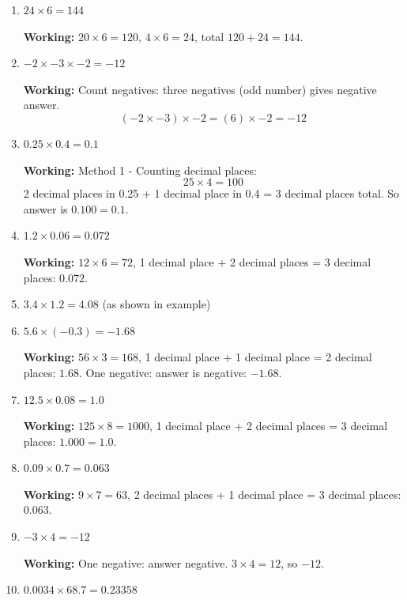 \documentclass[12pt,a4paper]{article}
\begin{document}
\begin{enumerate}
    \item $24 \times 6 = 144$
    
    \textbf{Working:} $20 \times 6 = 120$, $4 \times 6 = 24$, total $120 + 24 = 144$.
    
    \item $-2 \times -3 \times -2 = -12$
    
    \textbf{Working:} Count negatives: three negatives (odd number) gives negative answer.
    \[(-2 \times -3) \times -2 = (6) \times -2 = -12\]
    
    \item $0.25 \times 0.4 = 0.1$
    
    \textbf{Working:} Method 1 - Counting decimal places:
    \[25 \times 4 = 100\]
    2 decimal places in 0.25 + 1 decimal place in 0.4 = 3 decimal places total.
    So answer is $0.100 = 0.1$.
    
    \item $1.2 \times 0.06 = 0.072$
    
    \textbf{Working:} $12 \times 6 = 72$, 1 decimal place + 2 decimal places = 3 decimal places: $0.072$.
    
    \item $3.4 \times 1.2 = 4.08$ (as shown in example)
    
    \item $5.6 \times (-0.3) = -1.68$
    
    \textbf{Working:} $56 \times 3 = 168$, 1 decimal place + 1 decimal place = 2 decimal places: $1.68$.
    One negative: answer is negative: $-1.68$.
    
    \item $12.5 \times 0.08 = 1.0$
    
    \textbf{Working:} $125 \times 8 = 1000$, 1 decimal place + 2 decimal places = 3 decimal places: $1.000 = 1.0$.
    
    \item $0.09 \times 0.7 = 0.063$
    
    \textbf{Working:} $9 \times 7 = 63$, 2 decimal places + 1 decimal place = 3 decimal places: $0.063$.
    
    \item $-3 \times 4 = -12$
    
    \textbf{Working:} One negative: answer negative. $3 \times 4 = 12$, so $-12$.
    
    \item $0.0034 \times 68.7 = 0.23358$
    

\end{enumerate}
\end{document}
